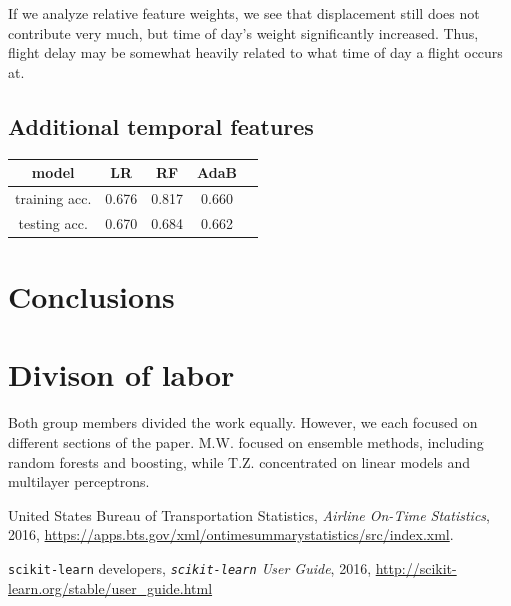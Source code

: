 \documentclass{article}
\begin{document}
\begin{multicols}{2}
If we analyze relative feature weights,
we see that displacement still does not contribute very much,
but time of day's weight significantly increased.
Thus, flight delay may be somewhat heavily related to
what time of day a flight occurs at.

\subsection{Additional temporal features}


\begin{center}
    \begin{tabular}{c|cccc}
        model &
          LR & RF & AdaB \\\hline
        training acc. &
          0.676 & 0.817 & 0.660 \\
        testing acc. &
          0.670 & 0.684 & 0.662
    \end{tabular}
\end{center}

\section{Conclusions}





\section{Divison of labor}

Both group members divided the work equally.
However, we each focused on different sections of the paper.
M.W. focused on ensemble methods, including random forests and boosting,
while T.Z. concentrated on linear models and multilayer perceptrons.

\begin{thebibliography}{4}
  United States Bureau of Transportation Statistics,
  \emph{Airline On-Time Statistics},
  2016,
  \url{https://apps.bts.gov/xml/ontimesummarystatistics/src/index.xml}.
  
  \texttt{scikit-learn} developers,
  \emph{\texttt{scikit-learn} User Guide},
  2016,
  \url{http://scikit-learn.org/stable/user_guide.html}
\end{thebibliography}


\end{multicols}
\end{document}
